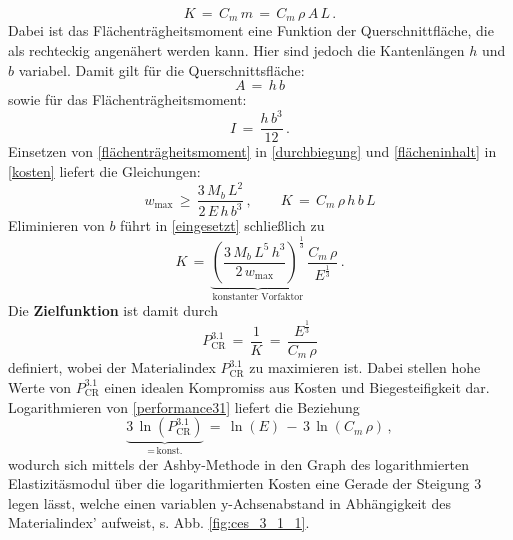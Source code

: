 \begin{equation} \label{kosten}
	K\,=\,C_m\,m\,=\,C_m\,\rho\,A\,L\,.
\end{equation}
Dabei ist das Flächenträgheitsmoment eine Funktion der Querschnittfläche, die als rechteckig angenähert werden kann. Hier sind jedoch die Kantenlängen $h$ und $b$ variabel. Damit gilt für die Querschnittsfläche:
\begin{equation} \label{flächeninhalt}
A\,=\,h\,b
\end{equation}
sowie für das Flächenträgheitsmoment:
\begin{equation} \label{flächenträgheitsmoment}
I\,=\,\frac{h\,b^3}{12}\,.
\end{equation}
Einsetzen von \ref{flächenträgheitsmoment} in \ref{durchbiegung} und \ref{flächeninhalt} in \ref{kosten} liefert die Gleichungen:
\begin{equation} \label{eingesetzt}
	w_{\text{max}}\,\ge\,\frac{3\,M_b \,L^2}{2\,E\,h\,b^3}\,, \qquad
	K\,=\,C_m\,\rho\,h\,b\,L
\end{equation}
Eliminieren von $b$ führt in \ref{eingesetzt} schließlich zu
\begin{equation}\label{performance}
K\,=\,\underbrace{\left(\frac{3\,M_b\,L^5\,h^3}{2\,w_{\text{max}}}\right)^{\frac{1}{3}}}_{\text{konstanter Vorfaktor}}\,\frac{C_m\,\rho}{E^{\frac{1}{3}}}\,.
\end{equation}
Die \textbf{Zielfunktion} ist damit durch
\begin{equation} \label{performance31}
P_{\text{CR}}^{3.1}\,=\,\frac{1}{K}\,=\,\frac{E^\frac{1}{3}}{C_m\,\rho}
\end{equation}
definiert, wobei der Materialindex $P_{\text{CR}}^{3.1}$ zu maximieren ist. Dabei stellen hohe Werte von $P_{\text{CR}}^{3.1}$ einen idealen Kompromiss aus Kosten und Biegesteifigkeit dar.\\
Logarithmieren von \ref{performance31} liefert die Beziehung
\begin{equation}
\underbrace{3\,\ln(P_{\text{CR}}^{3.1})}_{=\,\text{konst.}}\,=\,\ln(E)\,-\,3\,\ln(C_m\,\rho)\,,
\end{equation}
wodurch sich mittels der Ashby-Methode in den Graph des logarithmierten Elastizitäsmodul über die logarithmierten Kosten eine Gerade der Steigung 3 legen lässt, welche einen variablen y-Achsenabstand in Abhängigkeit des Materialindex' aufweist, s. Abb. \ref{fig:ces_3_1_1}.\\
